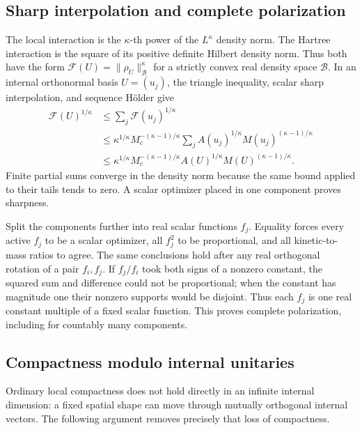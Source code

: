 \subsection{Sharp interpolation and complete polarization}
The local interaction is the $\kappa$-th power of the $L^\kappa$
density norm. The Hartree interaction is the square of its positive
definite Hilbert density norm. Thus both have the form
$\mathcal F(U)=\|\rho_U\|_{\mathcal B}^\kappa$ for a strictly convex
real density space $\mathcal B$.
In an internal orthonormal basis $U=(u_j)$, the triangle inequality,
scalar sharp interpolation, and sequence H\"older give
\begin{align*}
 \mathcal F(U)^{1/\kappa}
 &\le\sum_j\mathcal F(u_j)^{1/\kappa}\\
 &\le\kappa^{1/\kappa}M_c^{-(\kappa-1)/\kappa}
   \sum_j A(u_j)^{1/\kappa}M(u_j)^{(\kappa-1)/\kappa}\\
 &\le\kappa^{1/\kappa}M_c^{-(\kappa-1)/\kappa}
              A(U)^{1/\kappa}M(U)^{(\kappa-1)/\kappa}.
\end{align*}
Finite partial sums converge in the density norm because the same
bound applied to their tails tends to zero. A scalar optimizer placed
in one component proves sharpness.

Split the components further into real scalar functions $f_j$.
Equality forces every active $f_j$ to be a scalar optimizer, all
$f_j^2$ to be proportional, and all kinetic-to-mass ratios to agree.
The same conclusions hold after any real orthogonal rotation of a
pair $f_i,f_j$. If $f_j/f_i$ took both signs of a nonzero constant,
the squared sum and difference could not be proportional; when the
constant has magnitude one their nonzero supports would be disjoint.
Thus each $f_j$ is one real constant multiple of a fixed scalar
function. This proves complete polarization, including for countably
many components.

\subsection{Compactness modulo internal unitaries}
Ordinary local compactness does not hold directly in an infinite
internal dimension: a fixed spatial shape can move through mutually
orthogonal internal vectors. The following argument removes precisely
that loss of compactness.

